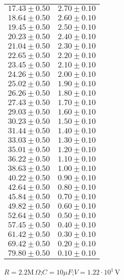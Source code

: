 \documentclass[12pt, letterpaper]{article} %
\theoremstyle{plain} %
\begin{document}
\begin{figure}[H]
\begin{minipage}[t]{0.48\textwidth}
\begin{minipage}[t]{\linewidth}
\begin{tabular}{|c|c|}
$17.43 \pm 0.50$ & $2.70 \pm 0.10$ \\
$18.64 \pm 0.50$ & $2.60 \pm 0.10$ \\
$19.45 \pm 0.50$ & $2.50 \pm 0.10$ \\
$20.23 \pm 0.50$ & $2.40 \pm 0.10$ \\
$21.04 \pm 0.50$ & $2.30 \pm 0.10$ \\
$22.65 \pm 0.50$ & $2.20 \pm 0.10$ \\
$23.45 \pm 0.50$ & $2.10 \pm 0.10$ \\
$24.26 \pm 0.50$ & $2.00 \pm 0.10$ \\
$25.02 \pm 0.50$ & $1.90 \pm 0.10$ \\
$26.26 \pm 0.50$ & $1.80 \pm 0.10$ \\
$27.43 \pm 0.50$ & $1.70 \pm 0.10$ \\
$29.03 \pm 0.50$ & $1.60 \pm 0.10$ \\
$30.23 \pm 0.50$ & $1.50 \pm 0.10$ \\
$31.44 \pm 0.50$ & $1.40 \pm 0.10$ \\
$33.03 \pm 0.50$ & $1.30 \pm 0.10$ \\
$35.01 \pm 0.50$ & $1.20 \pm 0.10$ \\
$36.22 \pm 0.50$ & $1.10 \pm 0.10$ \\
$38.63 \pm 0.50$ & $1.00 \pm 0.10$ \\
$40.22 \pm 0.50$ & $0.90 \pm 0.10$ \\
$42.64 \pm 0.50$ & $0.80 \pm 0.10$ \\
$45.84 \pm 0.50$ & $0.70 \pm 0.10$ \\
$49.82 \pm 0.50$ & $0.60 \pm 0.10$ \\
$52.64 \pm 0.50$ & $0.50 \pm 0.10$ \\
$57.45 \pm 0.50$ & $0.40 \pm 0.10$ \\
$61.42 \pm 0.50$ & $0.30 \pm 0.10$ \\
$69.42 \pm 0.50$ & $0.20 \pm 0.10$ \\
$79.80 \pm 0.50$ & $0.10 \pm 0.10$ \\
\hline
\end{tabular}
\caption*{$R = 2.2 \text{M}\,\Omega$;$C = 10\mu F$;$V = 1.22 \cdot 10^{1}$\,V}
\end{minipage}


\end{minipage}
\end{figure}
\end{document}
